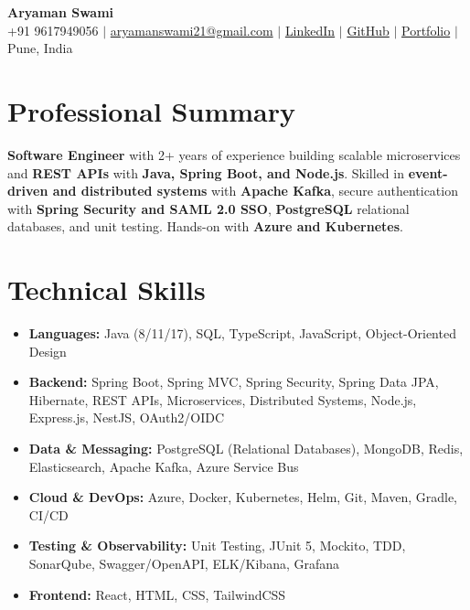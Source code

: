 \documentclass[letterpaper,10pt]{article}
\makeatletter
\newcommand{\resumeEmail}{aryamanswami21@gmail.com}
\makeatother
\begin{document}

\begin{center}
    {\Huge \textbf{Aryaman Swami}} \\ \vspace{3pt}
    \small
    +91 9617949056 $|$
    \href{mailto:\resumeEmail}{\resumeEmail} $|$
    \href{https://linkedin.com/in/aryaman-swami}
    {LinkedIn} $|$
    \href{https://github.com/Aryaman-Swami}
    {GitHub} $|$
    \href{https://aryaman-swami.netlify.app/}
    {Portfolio} $|$
    Pune, India
\end{center}

\vspace{-8pt}


\section{Professional Summary}

{\small
\textbf{Software Engineer} with 2+ years of experience building scalable
microservices and \textbf{REST APIs} with \textbf{Java, Spring Boot, and
Node.js}. Skilled in \textbf{event-driven and distributed systems} with
\textbf{Apache Kafka}, secure authentication with \textbf{Spring Security
and SAML 2.0 SSO}, \textbf{PostgreSQL} relational databases, and unit
testing. Hands-on with \textbf{Azure and Kubernetes}.
}


\section{Technical Skills}

\begin{itemize}[
    leftmargin=0.15in,
    label={},
    itemsep=1pt,
    parsep=0pt,
    topsep=2pt
]

\item \small{
\textbf{Languages:} Java (8/11/17), SQL, TypeScript, JavaScript, Object-Oriented Design
}

\item \small{
\textbf{Backend:} Spring Boot, Spring MVC, Spring Security, Spring Data JPA,
Hibernate, REST APIs, Microservices, Distributed Systems, Node.js, Express.js, NestJS,
OAuth2/OIDC
}

\item \small{
\textbf{Data \& Messaging:} PostgreSQL (Relational Databases), MongoDB, Redis,
Elasticsearch, Apache Kafka, Azure Service Bus
}

\item \small{
\textbf{Cloud \& DevOps:} Azure, Docker, Kubernetes, Helm,
Git, Maven, Gradle, CI/CD
}

\item \small{
\textbf{Testing \& Observability:} Unit Testing, JUnit 5, Mockito, TDD,
SonarQube, Swagger/OpenAPI, ELK/Kibana, Grafana
}

\item \small{
\textbf{Frontend:} React, HTML, CSS, TailwindCSS
}

\end{itemize}
\end{document}
